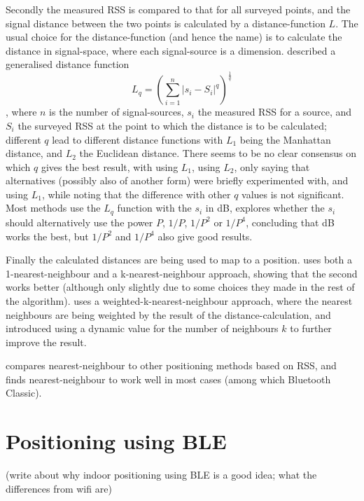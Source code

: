 Secondly the measured RSS is compared to that for all surveyed points, and the signal distance between the two points is calculated by a distance-function $L$.
The usual choice for the distance-function (and hence the name) is to calculate the distance in signal-space, where each signal-source is a dimension.
\citet{li2005method} described a generalised distance function
\begin{equation}
    L_q = \left(\sum_{i=1}^{n}|s_i-S_i|^q\right)^{\frac{1}{q}}
    \label{eq:architecture-distance}
\end{equation}
, where $n$ is the number of signal-sources, $s_i$ the measured RSS for a source, and $S_i$ the surveyed RSS at the point to which the distance is to be calculated; different $q$ lead to different distance functions with $L_1$ being the Manhattan distance, and $L_2$ the Euclidean distance.
There seems to be no clear consensus on which $q$ gives the best result, with \citet{shin2012enhanced} using $L_1$, \citet{bahl2000radar} using $L_2$, only saying that alternatives (possibly also of another form) were briefly experimented with, and \citet{li2005method} using $L_1$, while noting that the difference with other $q$ values is not significant.
Most methods use the $L_q$ function with the $s_i$ in dB, \citet{li2005method} explores whether the $s_i$ should alternatively use the power $P$, $1/P$, $1/P^2$ or $1/P^4$, concluding that dB works the best, but $1/P^2$ and $1/P^4$ also give good results.

Finally the calculated distances are being used to map to a position.
\citet{bahl2000radar} uses both a 1-nearest-neighbour and a k-nearest-neighbour approach, showing that the second works better (although only slightly due to some choices they made in the rest of the algorithm).
\citet{li2005method} uses a weighted-k-nearest-neighbour approach, where the nearest neighbours are being weighted by the result of the distance-calculation, and \citet{shin2012enhanced} introduced using a dynamic value for the number of neighbours $k$ to further improve the result.

\citet{pandya2003indoor} compares nearest-neighbour to other positioning methods based on RSS, and finds nearest-neighbour to work well in most cases (among which Bluetooth Classic).

\section{Positioning using BLE}
(write about why indoor positioning using BLE is a good idea; what the differences from wifi are)

